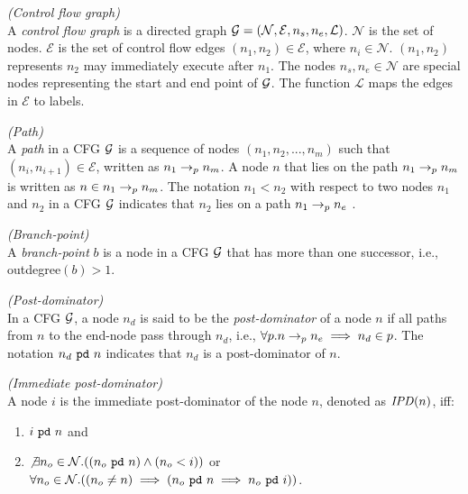 \begin{mydef}\label{defcfg}
\emph{(Control flow graph)}\\
A \emph{control flow graph} is a directed graph $\mathcal{G} =
(\mathcal{N}, \mathcal{E}, n_s, n_e, \mathcal{L})$. $\mathcal{N}$ is the set of
nodes. $\mathcal{E}$ is the set of control flow edges $(n_1, n_2)
\in \mathcal{E}$, where $n_i \in \mathcal{N}$. $(n_1, n_2)$ represents $n_2$ may
immediately execute after $n_1$. The nodes $n_s, n_e \in \mathcal{N}$
are special nodes representing the start and end point of $\mathcal{G}$.  The
function $\mathcal{L}$ maps the edges in $\mathcal{E}$ to labels.
\end{mydef}

\begin{mydef}\label{defpath}
\emph{(Path)}\\
A \emph{path} in a CFG $\mathcal{G}$ is a sequence of nodes $(n_1, n_2, ...,
n_m)$ such that $(n_i, n_{i+1}) \in \mathcal{E}$, written as
$n_1 \rightarrow_p n_m$. 
A node $n$ that lies on the path $n_1 \rightarrow_p n_m$ is written as
$n \in n_1 \rightarrow_p n_m$.
The notation $n_1 < n_2$ with respect to two nodes $n_1$ and $n_2$ in
a CFG $\mathcal{G}$ indicates that $n_2$ lies on a path $n_1 \rightarrow_p n_e$ . 
\end{mydef}

\begin{mydef}\label{defbp}
\emph{(Branch-point)}\\
A \emph{branch-point} $b$ is a node in a CFG $\mathcal{G}$ that has more than
one successor, i.e., \\ outdegree$(b) > 1$.
\end{mydef}

\begin{mydef}\label{defpd}
\emph{(Post-dominator)}\\
In a CFG $\mathcal{G}$, a node $n_d$ is said to be the \emph{post-dominator} of a node
$n$ if all paths from $n$ to the end-node pass through $n_d$, i.e.,
$\forall p. n \rightarrow_p n_e \implies n_d \in p$. The notation
\emph{$n_d~\texttt{pd}~n$} indicates that $n_d$ is a post-dominator of $n$.
\end{mydef}

\begin{mydef}\label{defipd}
\emph{(Immediate post-dominator)}\\
A node $i$ is the immediate post-dominator of the node $n$, denoted as
$\mathit{IPD}(n)$, if{f}:
\begin{enumerate}
\item \emph{$i~\texttt{pd}~n$} and
\item \emph{$\not\exists n_o \in \mathcal{N}.((n_o~\texttt{pd}~n) \wedge (n_o <
  i))$} or \\
  \emph{$\forall n_o \in \mathcal{N}.((n_o \neq n) \implies (n_o~\texttt{pd}~n
  \implies n_o~\texttt{pd}~i))$}.
\end{enumerate}
\end{mydef}

